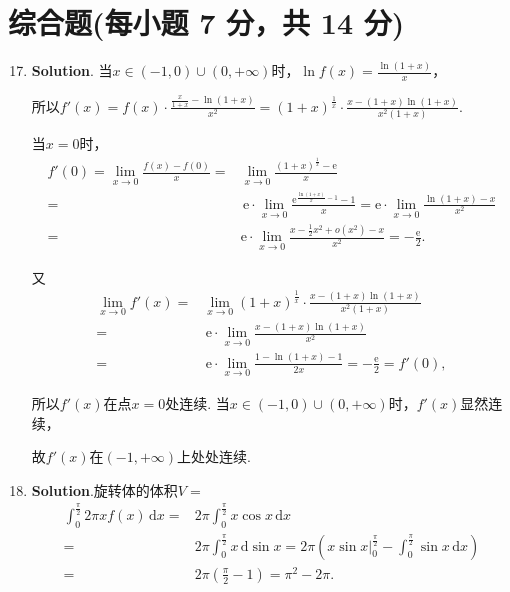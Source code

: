 \documentclass[../Main.tex]{subfiles}
\begin{document}
\section{综合题(每小题 7 分，共 14 分)}
\begin{enumerate}
    \setcounter{enumi}{16}
    \item \textbf{Solution}. 当$x\in(-1,0)\cup(0,+\infty)$时，$\ln f(x) = \frac{\ln(1+x)}{x}$，

          所以$f'(x)=f(x)\cdot \frac{\frac{x}{1+x}-\ln(1+x)}{x^{2}}=(1+x)^{\frac{1}{x}}
              \cdot\frac{x-(1+x)\ln(1+x)}{x^{2}(1+x)}$.

          当$x=0$时，
          \[
              \begin{aligned}
                  f'(0)=\lim_{x\to0}\frac{f(x)-f(0)}{x}= & \lim_{x\to0}\frac{(1+x)^{\frac{1}{x}}-\mathrm{e}}{x}                                                                           \\
                  =                                      & \,\mathrm{e}\cdot\lim_{x\to0}\frac{\mathrm{e}^{\frac{\ln(1+x)}{x}-1}-1}{x}= \mathrm{e}\cdot \lim_{x\to0}\frac{\ln(1+x)-x}{x^2} \\
                  =                                      & \mathrm{e}\cdot \lim_{x\to0}\frac{x-\frac{1}{2}x^2+o(x^2)-x}{x^2}=-\frac{\mathrm{e}}{2}.
              \end{aligned}
          \]

          又
          \[
              \begin{aligned}
                  \lim_{x\to0}f'(x) = & \lim_{x\to0}(1+x)^{\frac{1}{x}}\cdot\frac{x-(1+x)\ln(1+x)}{x^{2}(1+x)}            \\
                  =                   & \,\mathrm{e}\cdot\lim_{x\to0}\frac{x-(1+x)\ln(1+x)}{x^{2}}                        \\
                  =                   & \,\mathrm{e}\cdot\lim_{x\to0}\frac{1-\ln(1+x)-1}{2x}=-\frac{\mathrm{e}}{2}=f'(0),
              \end{aligned}
          \]

          所以$f'(x)$在点$x=0$处连续. 当$x\in(-1,0)\cup(0,+\infty)$时，$f'(x)$显然连续，

          故$f'(x)$在$(-1,+\infty)$上处处连续.

    \item \textbf{Solution}.旋转体的体积$V=$
          \[
              \begin{aligned}
                  \int_{0}^{\frac{\pi}{2}}2\pi x f(x)\,\mathrm{d}x = & 2\pi\int_{0}^{\frac{\pi}{2}}x\cos x\,\mathrm{d}x                                                                                                 \\
                  =                                                  & 2\pi\int_{0}^{\frac{\pi}{2}}x\,\mathrm{d}\sin x = 2\pi\left(x\sin x\bigg|_{0}^{\frac{\pi}{2}}-\int_{0}^{\frac{\pi}{2}}\sin x\,\mathrm{d}x\right) \\
                  =                                                  & 2\pi\left(\frac{\pi}{2}-1\right)=\pi^{2}-2\pi.
              \end{aligned}
          \]
\end{enumerate}
\end{document}
